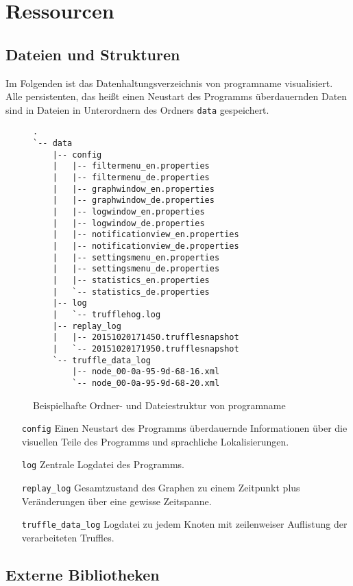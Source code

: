 \chapter{Ressourcen}
\section{Dateien und Strukturen}
Im Folgenden ist das Datenhaltungsverzeichnis von \gls{programname} visualisiert. Alle persistenten, das heißt einen Neustart des Programms überdauernden Daten sind in Dateien in Unterordnern des Ordners \texttt{data} gespeichert.
\begin{figure}[htb]
  \centering
\begin{verbatim}
.
`-- data
    |-- config
    |   |-- filtermenu_en.properties
    |   |-- filtermenu_de.properties
    |   |-- graphwindow_en.properties
    |   |-- graphwindow_de.properties
    |   |-- logwindow_en.properties
    |   |-- logwindow_de.properties
    |   |-- notificationview_en.properties
    |   |-- notificationview_de.properties
    |   |-- settingsmenu_en.properties
    |   |-- settingsmenu_de.properties
    |   |-- statistics_en.properties
    |   `-- statistics_de.properties
    |-- log
    |   `-- trufflehog.log
    |-- replay_log
    |   |-- 20151020171450.trufflesnapshot
    |   `-- 20151020171950.trufflesnapshot
    `-- truffle_data_log
        |-- node_00-0a-95-9d-68-16.xml
        `-- node_00-0a-95-9d-68-20.xml
\end{verbatim}
  \caption[Ordner- und Dateiestruktur von \gls{programname}]{Beispielhafte Ordner- und Dateiestruktur von \gls{programname}}
\end{figure}

\begin{itemize}
\item[\texttt{config}] Einen Neustart des Programms überdauernde Informationen über die visuellen Teile des Programms und sprachliche Lokalisierungen.
\item[\texttt{log}] Zentrale Logdatei des Programms.
\item[\texttt{replay\_log}] Gesamtzustand des Graphen zu einem Zeitpunkt plus Veränderungen über eine gewisse Zeitspanne.
\item[\texttt{truffle\_data\_log}] Logdatei zu jedem Knoten mit zeilenweiser Auflistung der verarbeiteten Truffles.
\end{itemize}

\section{Externe Bibliotheken}
